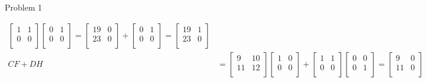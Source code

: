 \begin{problem}{Problem 1}
\begin{Highlight}[Solution]
\begin{align*}
\begin{bmatrix}
                1 & 1 \\
                0 & 0 \\
            \end{bmatrix}
            \begin{bmatrix}
                0 & 1 \\
                0 & 0 \\
            \end{bmatrix}
            = 
            \begin{bmatrix}
                19 & 0 \\
                23 & 0 \\
            \end{bmatrix}
            + 
            \begin{bmatrix}
                0 & 1 \\
                0 & 0 \\
            \end{bmatrix}
            =
            \begin{bmatrix}
                19 & 1 \\
                23 & 0 \\
            \end{bmatrix} \\
            CF + DH & =
            \begin{bmatrix}
                9 & 10 \\
                11 & 12 \\
            \end{bmatrix}
            \begin{bmatrix}
                1 & 0 \\
                0 & 0 \\
            \end{bmatrix}
            + 
            \begin{bmatrix}
                1 & 1 \\
                0 & 0 \\
            \end{bmatrix}
            \begin{bmatrix}
                0 & 0 \\
                0 & 1 \\
            \end{bmatrix}
            =
            \begin{bmatrix}
                9 & 0 \\
                11 & 0 \\

\end{bmatrix}
\end{align*}
\end{Highlight}
\end{problem}
